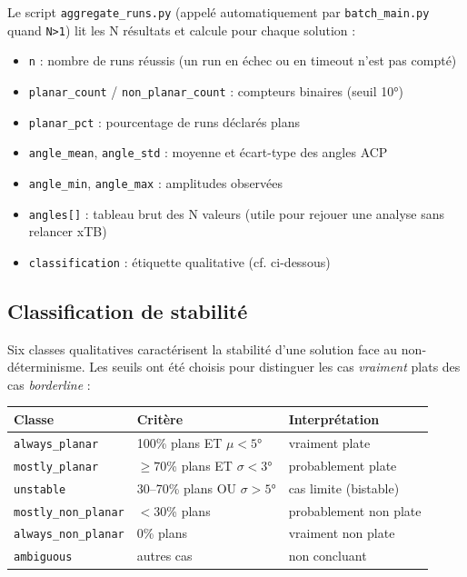 \documentclass[12pt,a4paper]{article}
\theoremstyle{definition}
\begin{document}
Le script \texttt{aggregate\_runs.py} (appelé automatiquement par \texttt{batch\_main.py}
quand \texttt{N>1}) lit les N résultats et calcule pour chaque solution :

\begin{itemize}
  \item \texttt{n} : nombre de runs réussis (un run en échec ou en timeout n'est pas compté)
  \item \texttt{planar\_count} / \texttt{non\_planar\_count} : compteurs binaires (seuil 10°)
  \item \texttt{planar\_pct} : pourcentage de runs déclarés plans
  \item \texttt{angle\_mean}, \texttt{angle\_std} : moyenne et écart-type des angles ACP
  \item \texttt{angle\_min}, \texttt{angle\_max} : amplitudes observées
  \item \texttt{angles[]} : tableau brut des N valeurs (utile pour rejouer une analyse sans
    relancer xTB)
  \item \texttt{classification} : étiquette qualitative (cf. ci-dessous)
\end{itemize}

\subsection{Classification de stabilité}

Six classes qualitatives caractérisent la stabilité d'une solution face au non-déterminisme.
Les seuils ont été choisis pour distinguer les cas \emph{vraiment} plats des cas
\emph{borderline} :

\begin{center}
\begin{tabular}{lll}
  \toprule
  Classe & Critère & Interprétation \\
  \midrule
  \texttt{always\_planar}      & 100\% plans ET $\mu < 5°$           & vraiment plate \\
  \texttt{mostly\_planar}      & $\geq 70$\% plans ET $\sigma < 3°$  & probablement plate \\
  \texttt{unstable}            & 30--70\% plans OU $\sigma > 5°$     & cas limite (bistable) \\
  \texttt{mostly\_non\_planar} & $< 30$\% plans                      & probablement non plate \\
  \texttt{always\_non\_planar} & 0\% plans                           & vraiment non plate \\
  \texttt{ambiguous}           & autres cas                          & non concluant \\
  \bottomrule
\end{tabular}
\end{center}
\end{document}
